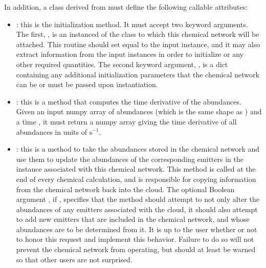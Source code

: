 \documentclass[letterpaper,10pt,english]{sphinxmanual}
\begin{document}
In addition, a class  derived from  must define
the following callable attributes:
\begin{itemize}
\item {} 
: this is the
initialization method. It must accept two keyword arguments. The
first, , is an instanced of the  class to which
this chemical network will be attached. This routine should set
 equal to the input  instance, and it may also
extract information from the input  instances in order to
initialize  or any other required quantities. The second
keyword argument, , is a dict containing any additional
initialization parameters that the chemical network can be or must
be passed upon instantiation.

\item {} 
: this is a method that computes the
time derivative of the abundances. Given an input numpy array of
abundances  (which is the same shape as ) and a time
, it must return a numpy array giving the time derivative of
all abundances in units of \(\mathrm{s}^{-1}.\)

\item {} 
: this is a method to
take the abundances stored in the chemical network and use them to
update the abundances of the corresponding emitters in the 
instance associated with this chemical network. This method is
called at the end of every chemical calculation, and is responsible
for copying information from the chemical network back into the
cloud. The optional Boolean argument , if ,
specifies that the method should attempt to not only alter the
abundances of any emitters associated with the cloud, it should also
attempt to add new emitters that are included in the chemical
network, and whose abundances are to be determined from it. It is up
to the user whether or not to honor this request and implement this
behavior. Failure to do so will not prevent the chemical network
from operating, but should at least be warned so that other users
are not surprised.

\end{itemize}
\end{document}
